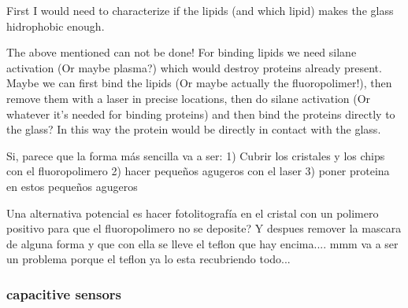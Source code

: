\documentclass[12pt]{article}
\newcommand\wordcount{
   \immediate\write18{wordcount.bat \jobname.tex}
   
}
\begin{document}
 First I would need to characterize if the lipids (and which lipid) makes the glass hidrophobic enough.

 The above mentioned can not be done! For binding lipids we need silane activation (Or maybe plasma?) which would destroy proteins already present.
 Maybe we can first bind the lipids (Or maybe actually the fluoropolimer!), then remove them with a laser in precise locations, then do silane activation 
 (Or whatever it's needed for binding proteins) and then bind the proteins directly to the glass? In this way the protein would be directly in contact with the glass.


 Si, parece que la forma más sencilla va a ser:
 1) Cubrir los cristales y los chips con el fluoropolimero
 2) hacer pequeños agugeros con el laser
 3) poner proteina en estos pequeños agugeros
 
 Una alternativa potencial es hacer fotolitografía en el cristal con un polimero positivo para que el fluoropolimero no se deposite?
 Y despues remover la mascara de alguna forma y que con ella se lleve el teflon que hay encima.... mmm va a ser un problema porque el teflon ya lo esta recubriendo todo...


 \subsubsection*{capacitive sensors}


\wordcount

\newpage


\end{document}
